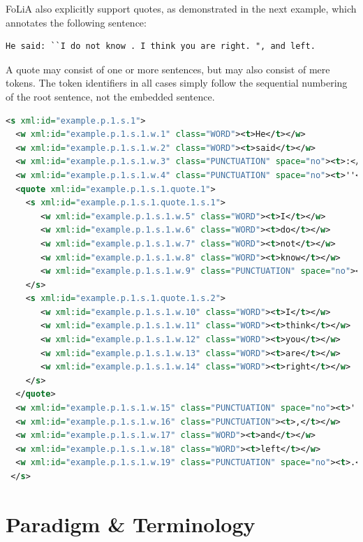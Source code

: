 \documentclass[a4paper,12pt]{report}
\begin{document}
FoLiA also explicitly support quotes, as demonstrated in the next example, which annotates the following sentence: 

\begin{verbatim}
He said: ``I do not know . I think you are right. ", and left.
\end{verbatim}

 A quote may consist of one or more sentences, but may also consist of mere tokens. The token identifiers in all cases simply follow the sequential numbering of the root sentence, not the embedded sentence.


\begin{lstlisting}[language=xml]
 <s xml:id="example.p.1.s.1">
  <w xml:id="example.p.1.s.1.w.1" class="WORD"><t>He</t></w>
  <w xml:id="example.p.1.s.1.w.2" class="WORD"><t>said</t></w>
  <w xml:id="example.p.1.s.1.w.3" class="PUNCTUATION" space="no"><t>:</t></w>
  <w xml:id="example.p.1.s.1.w.4" class="PUNCTUATION" space="no"><t>''</t></w>
  <quote xml:id="example.p.1.s.1.quote.1">
    <s xml:id="example.p.1.s.1.quote.1.s.1">
       <w xml:id="example.p.1.s.1.w.5" class="WORD"><t>I</t></w>
       <w xml:id="example.p.1.s.1.w.6" class="WORD"><t>do</t></w>
       <w xml:id="example.p.1.s.1.w.7" class="WORD"><t>not</t></w>
       <w xml:id="example.p.1.s.1.w.8" class="WORD"><t>know</t></w>
       <w xml:id="example.p.1.s.1.w.9" class="PUNCTUATION" space="no"><t>.</t></w>
    </s>
    <s xml:id="example.p.1.s.1.quote.1.s.2">
       <w xml:id="example.p.1.s.1.w.10" class="WORD"><t>I</t></w>
       <w xml:id="example.p.1.s.1.w.11" class="WORD"><t>think</t></w>
       <w xml:id="example.p.1.s.1.w.12" class="WORD"><t>you</t></w>
       <w xml:id="example.p.1.s.1.w.13" class="WORD"><t>are</t></w>
       <w xml:id="example.p.1.s.1.w.14" class="WORD"><t>right</t></w>
    </s>
  </quote>
  <w xml:id="example.p.1.s.1.w.15" class="PUNCTUATION" space="no"><t>''</t></w>
  <w xml:id="example.p.1.s.1.w.16" class="PUNCTUATION"><t>,</t></w>
  <w xml:id="example.p.1.s.1.w.17" class="WORD"><t>and</t></w>
  <w xml:id="example.p.1.s.1.w.18" class="WORD"><t>left</t></w>
  <w xml:id="example.p.1.s.1.w.19" class="PUNCTUATION" space="no"><t>.</t></w>
 </s>
\end{lstlisting}

    

\section{Paradigm \& Terminology}
\label{sec:paradigm}
\end{document}
